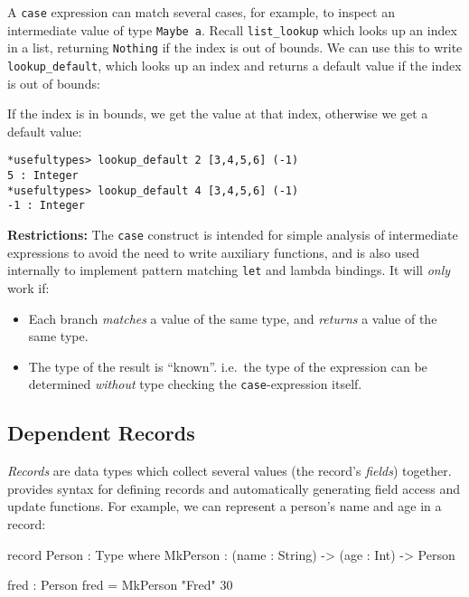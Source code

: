 A \texttt{case} expression can match several cases, for example, to inspect an intermediate value of type \texttt{Maybe a}.
Recall \texttt{list\_lookup} which looks up an index in a list, returning \texttt{Nothing} if the index is out
of bounds.
We can use this to write \texttt{lookup\_default}, which looks up an index and returns a default value if the index is out of bounds:


\noindent
If the index is in bounds, we get the value at that index, otherwise we get a default value:

\begin{lstlisting}[style=stdout]
*usefultypes> lookup_default 2 [3,4,5,6] (-1)
5 : Integer
*usefultypes> lookup_default 4 [3,4,5,6] (-1)
-1 : Integer
\end{lstlisting}
 

\noindent
\textbf{Restrictions:} The \texttt{case} construct is intended for simple analysis of intermediate expressions to avoid the need to write auxiliary functions, and is also used internally to implement pattern matching \texttt{let} and lambda bindings. 
It will \emph{only} work if:

\begin{itemize}
\item Each branch \emph{matches} a value of the same type, and \emph{returns} a value of the same type.
\item The type of the result is ``known''. i.e.\ the type of the expression can be determined \emph{without} type checking the \texttt{case}-expression itself. 
\end{itemize}

\subsection{Dependent Records}

\emph{Records} are data types which collect several values (the record's \emph{fields}) together.
\Idris{} provides syntax for defining records and automatically generating field access and update functions.
For example, we can represent a person's name and age in a record:

\begin{code}
record Person : Type where
    MkPerson : (name : String) ->
               (age : Int) -> Person

fred : Person
fred = MkPerson "Fred" 30
\end{code}
 

